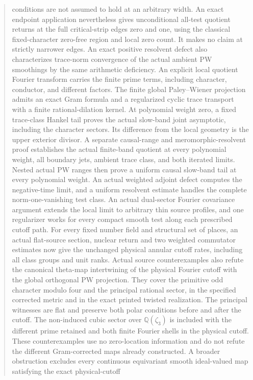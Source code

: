 \documentclass[11pt,a4paper]{article}
\begin{document}
\begin{abstract}
conditions are not assumed to hold at an arbitrary width. An exact
endpoint application nevertheless gives unconditional all-test
quotient returns at the full critical-strip edges zero and one,
using the classical fixed-character zero-free region and local
zero count. It makes no claim at strictly narrower edges. An exact
positive resolvent defect also characterizes trace-norm convergence
of the actual ambient PW smoothings by the same arithmetic deficiency. An explicit local quotient Fourier transform carries
the finite prime terms, including character, conductor, and
different factors. The finite global Paley--Wiener projection
admits an exact Gram formula and a regularized cyclic trace
transport with a finite rational-dilation kernel. At polynomial
weight zero, a fixed trace-class Hankel tail proves the actual
slow-band joint asymptotic, including the character sectors. Its
difference from the local geometry is the upper exterior divisor.
A separate causal-range and meromorphic-resolvent proof establishes
the actual finite-band quotient at every polynomial weight, all
boundary jets, ambient trace class, and both iterated limits.
Nested actual PW ranges then prove a uniform causal slow-band
tail at every polynomial weight. An actual weighted adjoint defect
computes the negative-time limit, and a uniform resolvent estimate
handles the complete norm-one-vanishing test class. An actual dual-sector Fourier covariance argument extends the local
limit to arbitrary thin source profiles, and one regularizer works
for every compact smooth test along each prescribed cutoff path.
For every fixed number field and structural set of places, an
actual flat-source section, nuclear return and two weighted
commutator estimates now give the unchanged physical annular
cutoff rates, including all class groups and unit ranks.
Actual source counterexamples also refute the canonical theta-map
intertwining of the physical Fourier cutoff with the global
orthogonal PW projection. They cover the primitive odd character
modulo four and the principal rational sector, in the specified
corrected metric and in the exact printed twisted realization.
The principal witnesses are flat and preserve both polar conditions
before and after the cutoff. The non-induced cubic sector over
$\mathbb Q(\zeta_3)$ is included with the different prime retained
and both finite Fourier shells in the physical cutoff. These
counterexamples use no zero-location information
and do not refute the different Gram-corrected maps already constructed.
A broader obstruction excludes every continuous equivariant
smooth ideal-valued map satisfying the exact physical-cutoff

\end{abstract}
\end{document}
